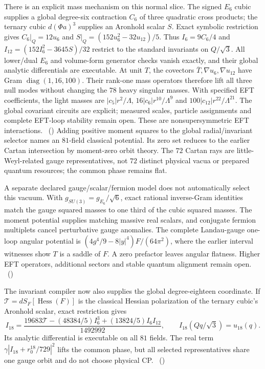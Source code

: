 There is an explicit mass mechanism on this normal slice. The signed $E_6$
cubic supplies a global degree-six contraction $C_6$ of three quadratic cross
products; the ternary cubic $d(\Phi a)^3$ supplies an Aronhold scalar $S$.
Exact symbolic restriction gives $C_6|_Q=12u_6$ and
$S|_Q=(152u_6^2-32u_{12})/5$. Thus
$I_6=9C_6/4$ and $I_{12}=(152I_6^2-3645S)/32$ restrict to the standard
invariants on $Q/\sqrt3$. All lower/dual $E_6$ and volume-form generator
checks vanish exactly, and their global analytic differentials are executable. At unit $T$, the covectors
$\overline T,\nabla u_6,\nabla u_{12}$ have Gram $\operatorname{diag}(1,16,100)$.
Their rank-one mass operators therefore lift all three null modes without
changing the $78$ heavy singular masses. With specified EFT coefficients,
the light masses are $|c_5|r^2/\Lambda$, $16|c_6|r^{10}/\Lambda^9$ and
$100|c_{12}|r^{22}/\Lambda^{21}$. The global covariant circuits are explicit;
measured scales, particle assignments and complete EFT-loop stability remain
open. These are nonsupersymmetric EFT interactions.
\tierC\ ()
Adding positive moment squares to the global radial/invariant selector names
an $81$-field classical potential. Its zero set reduces to the earlier
Cartan intersection by moment-zero orbit theory. The $72$ Cartan rays are
little-Weyl-related gauge representatives, not $72$ distinct physical vacua
or prepared quantum resources; the common phase remains flat.

A separate declared gauge/scalar/fermion model does not automatically select
this vacuum. With $g_{SU(3)}=g_{E_6}/\sqrt6$, exact rational inverse-Gram
identities match the gauge squared masses to one third of the cubic squared
masses. The moment potential supplies matching massive real scalars, and
conjugate fermion multiplets cancel perturbative gauge anomalies. The complete
Landau-gauge one-loop angular potential is
$(4g^4/9-8|y|^4)F/(64\pi^2)$, where the earlier interval witnesses show $T$
is a saddle of $F$. A zero prefactor leaves angular flatness. Higher EFT
operators, additional sectors and stable quantum alignment remain open.
\tierC\ ()


The invariant compiler now also supplies the global degree-eighteen coordinate.
If $\mathcal T=dS_F[\operatorname{Hess}(F)]$ is the classical Hessian
polarization of the ternary cubic's Aronhold scalar, exact restriction gives
\[
 I_{18}=\frac{19683\mathcal T-(48384/5)I_6^3+(13824/5)I_6I_{12}}{1492992},
 \qquad I_{18}(Qq/\sqrt3)=u_{18}(q).
\]
Its analytic differential is executable on all $81$ fields. The real term
$\gamma|I_{18}+r_0^{18}/729|^2$ lifts the common phase, but all selected
representatives share one gauge orbit and do not choose physical CP.
\tierC\ ()

